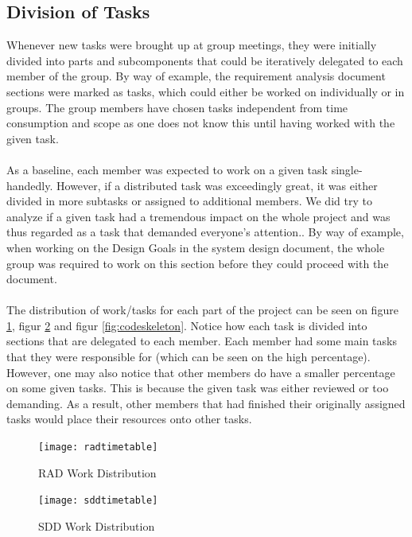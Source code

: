 \subsection{Division of Tasks}

Whenever new tasks were brought up at group meetings, they were initially divided into parts and subcomponents that could be iteratively delegated to each member of the group. By way of example, the requirement analysis document sections were marked as tasks, which could either be worked on individually or in groups. The group members have chosen tasks independent from time consumption and scope as one does not know this until having worked with the given task.
\\\\
As a baseline, each member was expected to work on a given task single-handedly. However, if a distributed task was exceedingly great, it was either divided in more subtasks or assigned to additional members. We did try to analyze if a given task had a tremendous impact on the whole project and was thus regarded as a task that demanded everyone's attention.. By way of example, when working on the Design Goals in the system design document, the whole group was required to work on this section before they could proceed with the document. 
\\\\
The distribution of work/tasks for each part of the project can be seen on figure \ref{fig:rad}, figur \ref{fig:sdd} and figur \ref{fig:codeskeleton}. Notice how each task is divided into sections that are delegated to each member. Each member had some main tasks that they were responsible for (which can be seen on the high percentage). However, one may also notice that other members do have a smaller percentage on some given tasks. This is because the given task was either reviewed or too demanding. As a result, other members that had finished their originally assigned tasks would place their resources onto other tasks.

\begin{figure}[H]
	\centering
	\texttt{[image: radtimetable]}
	\caption{RAD Work Distribution}
	\label{fig:rad}
\end{figure}

\begin{figure}[H]
	\centering
	\texttt{[image: sddtimetable]}
	\caption{SDD Work Distribution}
	\label{fig:sdd}
\end{figure}

